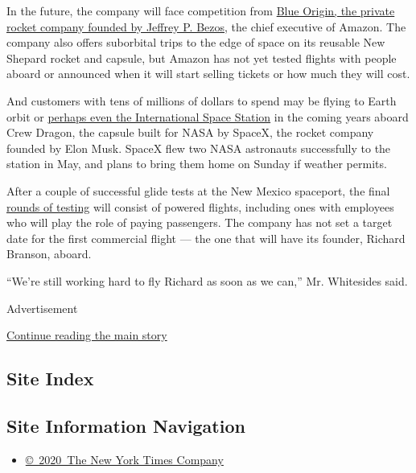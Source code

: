 In the future, the company will face competition from
\href{https://www.nytimes3xbfgragh.onion/2020/04/30/science/nasa-moon-lander.html}{Blue
Origin, the private rocket company founded by Jeffrey P. Bezos}, the
chief executive of Amazon. The company also offers suborbital trips to
the edge of space on its reusable New Shepard rocket and capsule, but
Amazon has not yet tested flights with people aboard or announced when
it will start selling tickets or how much they will cost.

And customers with tens of millions of dollars to spend may be flying to
Earth orbit or
\href{https://www.nytimes3xbfgragh.onion/2020/03/05/science/axiom-space-station.html}{perhaps
even the International Space Station} in the coming years aboard Crew
Dragon, the capsule built for NASA by SpaceX, the rocket company founded
by Elon Musk. SpaceX flew two NASA astronauts successfully to the
station in May, and plans to bring them home on Sunday if weather
permits.

After a couple of successful glide tests at the New Mexico spaceport,
the final
\href{https://www.nytimes3xbfgragh.onion/2018/12/13/science/virgin-galactic-spaceship.html}{rounds
of testing} will consist of powered flights, including ones with
employees who will play the role of paying passengers. The company has
not set a target date for the first commercial flight --- the one that
will have its founder, Richard Branson, aboard.

``We're still working hard to fly Richard as soon as we can,'' Mr.
Whitesides said.

Advertisement

\protect\hyperlink{after-bottom}{Continue reading the main story}

\hypertarget{site-index}{%
\subsection{Site Index}\label{site-index}}

\hypertarget{site-information-navigation}{%
\subsection{Site Information
Navigation}\label{site-information-navigation}}

\begin{itemize}
\tightlist
\item
  \href{https://help.nytimes3xbfgragh.onion/hc/en-us/articles/115014792127-Copyright-notice}{©~2020~The
  New York Times Company}
\end{itemize}


